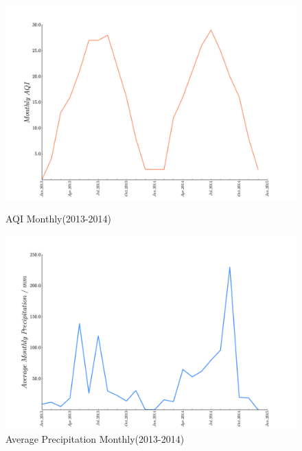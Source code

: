 \documentclass[a4paper,11pt]{article}
\begin{document}
\begin{figure}[h]
  \centering %
  \begin{minipage}[t]{.4\linewidth}
  \includegraphics[width=1\textwidth]{./Pic/mothlyAQI.png}
  \caption{AQI Monthly(2013-2014)}
  \label{fig:mothlyAQI}
  \end{minipage}
  \begin{minipage}[t]{.4\linewidth}
  
  \includegraphics[width=1\textwidth]{./Pic/js.png}
  \caption{Average Precipitation Monthly(2013-2014)}
  \label{fig:js}
  \end{minipage}
\end{figure}
\end{document}
